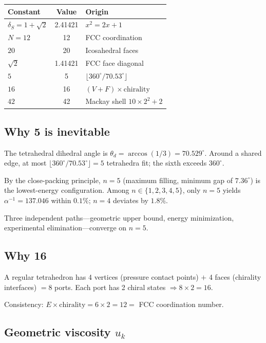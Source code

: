 \documentclass[12pt,a4paper,twocolumn]{article}
\newcommand{\dS}{\delta_{\!S}}
\newcommand{\uk}{u_k}
\begin{document}
\begin{center}
\small
\begin{tabular}{@{}lcl@{}}
\toprule
Constant & Value & Origin \\
\midrule
$\dS = 1+\sqrt{2}$ & 2.41421 & $x^2=2x+1$ \\
$N=12$ & 12 & FCC coordination \\
$20$ & 20 & Icosahedral faces \\
$\sqrt{2}$ & 1.41421 & FCC face diagonal \\
$5$ & 5 & $\lfloor 360^\circ/70.53^\circ \rfloor$ \\
$16$ & 16 & $(V\!+\!F)\times\text{chirality}$ \\
$42$ & 42 & Mackay shell $10\!\times\!2^2\!+\!2$ \\
\bottomrule
\end{tabular}
\end{center}

\subsection{Why 5 is inevitable}

The tetrahedral dihedral angle is $\theta_d = \arccos(1/3) = 70.529^\circ$. Around a shared edge, at most $\lfloor 360^\circ/70.53^\circ\rfloor = 5$ tetrahedra fit; the sixth exceeds $360^\circ$.

By the close-packing principle, $n=5$ (maximum filling, minimum gap of $7.36^\circ$) is the lowest-energy configuration. Among $n\in\{1,2,3,4,5\}$, only $n=5$ yields $\alpha^{-1}=137.046$ within $0.1\%$; $n=4$ deviates by $1.8\%$.

Three independent paths---geometric upper bound, energy minimization, experimental elimination---converge on $n=5$.

\subsection{Why 16}

A regular tetrahedron has 4 vertices (pressure contact points) $+$ 4 faces (chirality interfaces) $= 8$ ports. Each port has 2 chiral states $\Rightarrow 8\times 2 = 16$.

Consistency: $E \times \text{chirality} = 6\times 2 = 12 =$ FCC coordination number.

\subsection{Geometric viscosity $\uk$}
\end{document}
